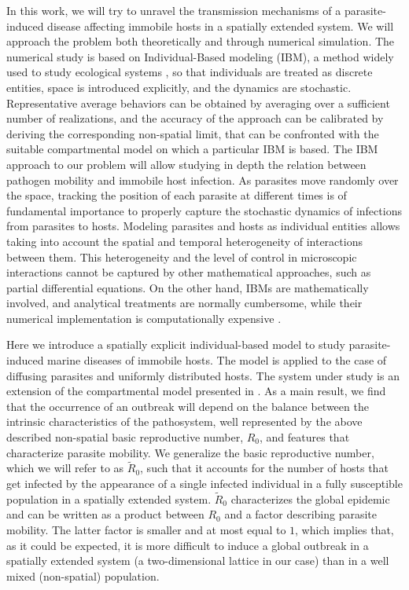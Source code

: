 In this work, we will try to unravel the transmission mechanisms of a
parasite-induced disease affecting immobile hosts in a spatially extended
system. We will approach the problem both theoretically and through numerical
simulation. The numerical study is based on Individual-Based modeling (IBM), a
method widely used to study ecological systems \cite{Grimm2005}, so that
individuals are treated as discrete entities, space is introduced explicitly,
and the dynamics are stochastic. Representative average behaviors can be
obtained by averaging over a sufficient number of realizations, and the
accuracy of the approach can be calibrated by deriving the corresponding
non-spatial limit, that can be confronted with the suitable compartmental model
on which a particular IBM is based. The IBM approach to our problem will allow
studying in depth the relation between pathogen mobility and immobile host
infection. As parasites move randomly over the space, tracking the position of
each parasite at different times is of fundamental importance to properly
capture the stochastic dynamics of infections from parasites to hosts.
Modeling parasites and hosts as individual entities allows taking into
account the spatial and temporal heterogeneity of interactions between them.
This heterogeneity and the level of control in microscopic interactions cannot
be captured by other mathematical approaches, such as partial differential
equations. On the other hand, IBMs are mathematically involved, and analytical
treatments are normally cumbersome, while their numerical implementation is
computationally expensive \cite{Breckling1900}.

Here we introduce a spatially explicit individual-based model to study
parasite-induced marine diseases of immobile hosts. The model is applied  to
the case of diffusing parasites and uniformly distributed hosts. The system
under study is an extension of the compartmental model presented in
\cite{GimenezRomero2021}. As a main result, we find that the occurrence of an
outbreak will depend on the balance between the intrinsic characteristics of
the pathosystem, well represented by the above described non-spatial basic
reproductive number, $R_0$, and features that characterize parasite mobility.
We generalize the basic reproductive number, which we will refer to as
$\tilde{R}_0$, such that it accounts for the number of hosts that get infected
by the appearance of a single infected individual in a fully susceptible
population in a spatially extended system. $\tilde{R}_0$ characterizes the
global epidemic and can be written as a product between $R_0$ and a factor
describing parasite mobility. The latter factor is smaller and at most equal to
$1$, which implies that, as it could be expected, it is more difficult to
induce a global outbreak in a spatially extended system (a two-dimensional
lattice in our case) than in a well mixed (non-spatial) population.

